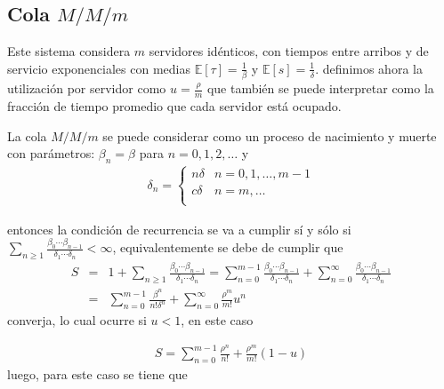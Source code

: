 \documentclass{article}
\newcommand{\esp}{\mathbb{E}}
\numberwithin{equation}{section}
\begin{document}
\subsection{Cola $M/M/m$}
%

Este sistema considera $m$ servidores id\'enticos, con tiempos entre arribos y de servicio exponenciales con medias $\esp\left[\tau\right]=\frac{1}{\beta}$ y
$\esp\left[s\right]=\frac{1}{\delta}$. definimos ahora la utilizaci\'on por servidor como $u=\frac{\rho}{m}$ que tambi\'en se puede interpretar como la fracci\'on de tiempo promedio que cada servidor est\'a ocupado.

La cola $M/M/m$ se puede considerar como un proceso de nacimiento y muerte con par\'ametros: $\beta_{n}=\beta$ para $n=0,1,2,\ldots$ y
\begin{eqnarray}
\delta_{n}=\left\{\begin{array}{cc}
n\delta & n=0,1,\ldots,m-1\\
c\delta & n=m,\ldots\\
\end{array}\right.
\end{eqnarray}

entonces  la condici\'on de recurrencia se va a cumplir s\'i y s\'olo si $\sum_{n\geq1}\frac{\beta_{0}\cdots\beta_{n-1}}{\delta_{1}\cdots\delta_{n}}<\infty$,
equivalentemente se debe de cumplir que
\begin{eqnarray*}
S&=&1+\sum_{n\geq1}\frac{\beta_{0}\cdots\beta_{n-1}}{\delta_{1}\cdots\delta_{n}}=\sum_{n=0}^{m-1}\frac{\beta_{0}\cdots\beta_{n-1}}{\delta_{1}\cdots\delta_{n}}+\sum_{n=0}^{\infty}\frac{\beta_{0}\cdots\beta_{n-1}}{\delta_{1}\cdots\delta_{n}}\\
&=&\sum_{n=0}^{m-1}\frac{\beta^{n}}{n!\delta^{n}}+\sum_{n=0}^{\infty}\frac{\rho^{m}}{m!}u^{n}
\end{eqnarray*}
converja, lo cual ocurre si $u<1$, en este caso

\begin{eqnarray}
S=\sum_{n=0}^{m-1}\frac{\rho^{n}}{n!}+\frac{\rho^{m}}{m!}\left(1-u\right)
\end{eqnarray}
luego, para este caso se tiene que
\end{document}
